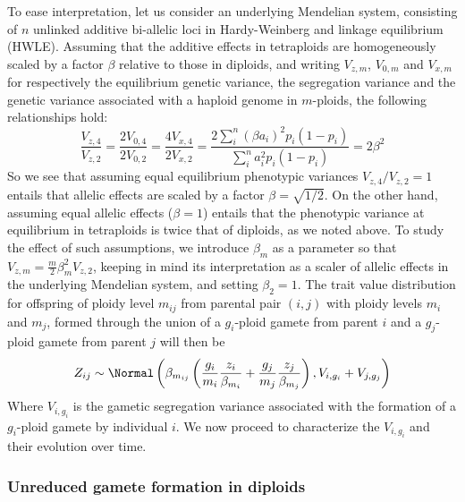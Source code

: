 To ease interpretation, let us consider an underlying Mendelian system,
consisting of \(n\) unlinked additive bi-allelic loci in Hardy-Weinberg
and linkage equilibrium (HWLE). Assuming that the additive effects in
tetraploids are homogeneously scaled by a factor \(\beta\) relative to
those in diploids, and writing \(V_{z,m}\), \(V_{0,m}\) and \(V_{x,m}\)
for respectively the equilibrium genetic variance, the segregation
variance and the genetic variance associated with a haploid genome in
\(m\)-ploids, the following relationships hold: \[
 \frac{V_{z,4}}{V_{z,2}} = \frac{2V_{0,4}}{2V_{0,2}} = \frac{4V_{x,4}}{2V_{x,2}} =
 \frac{2 \sum_i^n (\beta a_i)^2 p_i(1-p_i)}{\sum_i^n a_i^2 p_i(1-p_i)} =
 2\beta^2
\] So we see that assuming equal equilibrium phenotypic variances
\(V_{z,4}/V_{z,2} = 1\) entails that allelic effects are scaled by a
factor \(\beta=\sqrt{1/2}\). On the other hand, assuming equal allelic
effects (\(\beta=1\)) entails that the phenotypic variance at
equilibrium in tetraploids is twice that of diploids, as we noted above.
To study the effect of such assumptions, we introduce \(\beta_m\) as a
parameter so that \(V_{z,m} = \frac{m}{2}\beta_m^2 V_{z,2}\), keeping in
mind its interpretation as a scaler of allelic effects in the underlying
Mendelian system, and setting \(\beta_2=1\). The trait value
distribution for offspring of ploidy level \(m_{ij}\) from parental pair
\((i,j)\) with ploidy levels \(m_i\) and \(m_j\), formed through the
union of a \(g_i\)-ploid gamete from parent \(i\) and a \(g_j\)-ploid
gamete from parent \(j\) will then be \[Z_{ij} \sim \Normal\left(
    \beta_{m_{ij}} \left(
          \frac{g_i}{m_i}\frac{z_i}{\beta_{m_i}} 
        + \frac{g_j}{m_j}\frac{z_j}{\beta_{m_j}}\right), V_{i,g_i} + V_{j,g_j}\right)\]
Where \(V_{i,g_i}\) is the gametic segregation variance associated with
the formation of a \(g_i\)-ploid gamete by individual \(i\). We now
proceed to characterize the \(V_{i,g_i}\) and their evolution over time.

\hypertarget{unreduced-gamete-formation-in-diploids}{%
\subsubsection{Unreduced gamete formation in
diploids}\label{unreduced-gamete-formation-in-diploids}}

